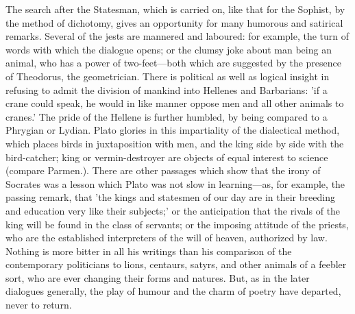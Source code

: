 \documentclass[11pt,letter]{article}
\begin{document}
\par  The search after the Statesman, which is carried on, like that for the Sophist, by the method of dichotomy, gives an opportunity for many humorous and satirical remarks. Several of the jests are mannered and laboured: for example, the turn of words with which the dialogue opens; or the clumsy joke about man being an animal, who has a power of two-feet—both which are suggested by the presence of Theodorus, the geometrician. There is political as well as logical insight in refusing to admit the division of mankind into Hellenes and Barbarians: 'if a crane could speak, he would in like manner oppose men and all other animals to cranes.' The pride of the Hellene is further humbled, by being compared to a Phrygian or Lydian. Plato glories in this impartiality of the dialectical method, which places birds in juxtaposition with men, and the king side by side with the bird-catcher; king or vermin-destroyer are objects of equal interest to science (compare Parmen.). There are other passages which show that the irony of Socrates was a lesson which Plato was not slow in learning—as, for example, the passing remark, that 'the kings and statesmen of our day are in their breeding and education very like their subjects;' or the anticipation that the rivals of the king will be found in the class of servants; or the imposing attitude of the priests, who are the established interpreters of the will of heaven, authorized by law. Nothing is more bitter in all his writings than his comparison of the contemporary politicians to lions, centaurs, satyrs, and other animals of a feebler sort, who are ever changing their forms and natures. But, as in the later dialogues generally, the play of humour and the charm of poetry have departed, never to return.
\end{document}
